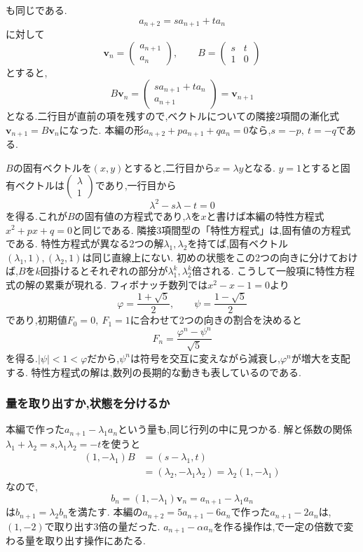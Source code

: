 も同じである.
\[
  a_{n+2}=sa_{n+1}+ta_n
\]
に対して
\[
  \boldsymbol{v}_n=
  \begin{pmatrix}a_{n+1}\\a_n\end{pmatrix},
  \qquad
  B=\begin{pmatrix}s&t\\1&0\end{pmatrix}
\]
とすると,
\[
  B\boldsymbol{v}_n
  =\begin{pmatrix}sa_{n+1}+ta_n\\a_{n+1}\end{pmatrix}
  =\boldsymbol{v}_{n+1}
\]
となる.二行目が直前の項を残すので,ベクトルについての隣接2項間の漸化式$\boldsymbol{v}_{n+1}=B\boldsymbol{v}_n$になった.
本編の形$a_{n+2}+pa_{n+1}+qa_n=0$なら,$s=-p,\ t=-q$である.

$B$の固有ベクトルを$(x,y)$とすると,二行目から$x=\lambda y$となる.
$y=1$とすると固有ベクトルは$\begin{pmatrix}\lambda\\1\end{pmatrix}$であり,一行目から
\[
  \lambda^2-s\lambda-t=0
\]
を得る.これが$B$の固有値の方程式であり,$\lambda$を$x$と書けば本編の特性方程式$x^2+px+q=0$と同じである.
隣接3項間型の「特性方程式」は,固有値の方程式である.
特性方程式が異なる2つの解$\lambda_1,\lambda_2$を持てば,固有ベクトル$(\lambda_1,1),(\lambda_2,1)$は同じ直線上にない.
初めの状態をこの2つの向きに分けておけば,$B$を$k$回掛けるとそれぞれの部分が$\lambda_1^k,\lambda_2^k$倍される.
こうして一般項に特性方程式の解の累乗が現れる.
フィボナッチ数列では$x^2-x-1=0$より
\[
  \varphi=\frac{1+\sqrt5}{2},
  \qquad
  \psi=\frac{1-\sqrt5}{2}
\]
であり,初期値$F_0=0,\ F_1=1$に合わせて2つの向きの割合を決めると
\[
  F_n=\frac{\varphi^n-\psi^n}{\sqrt5}
\]
を得る.$|\psi|<1<\varphi$だから,$\psi^n$は符号を交互に変えながら減衰し,$\varphi^n$が増大を支配する.
特性方程式の解は,数列の長期的な動きも表しているのである.

\subsubsection{量を取り出すか,状態を分けるか}
本編で作った$a_{n+1}-\lambda_1a_n$という量も,同じ行列の中に見つかる.
解と係数の関係$\lambda_1+\lambda_2=s$,$\lambda_1\lambda_2=-t$を使うと
\[
  \begin{aligned}
    (1,-\lambda_1)B
    &=(s-\lambda_1,t)\\
    &=(\lambda_2,-\lambda_1\lambda_2)
    =\lambda_2(1,-\lambda_1)
  \end{aligned}
\]
なので,
\[
  b_n=(1,-\lambda_1)\boldsymbol{v}_n=a_{n+1}-\lambda_1a_n
\]
は$b_{n+1}=\lambda_2b_n$を満たす.
本編の$a_{n+2}=5a_{n+1}-6a_n$で作った$a_{n+1}-2a_n$は,$(1,-2)$で取り出す$3$倍の量だった.
$a_{n+1}-\alpha a_n$を作る操作は,で一定の倍数で変わる量を取り出す操作にあたる.

